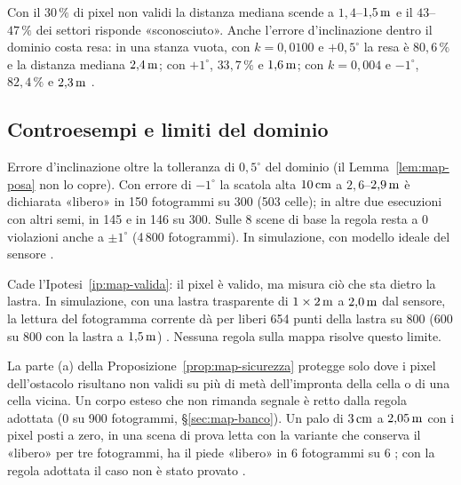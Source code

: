 Con il $30\,\%$ di pixel non validi la distanza mediana scende a $1{,}4$–$1{,}5\,\mathrm{m}$ e il $43$–$47\,\%$ dei settori risponde «sconosciuto». Anche l'errore d'inclinazione dentro il dominio costa resa: in una stanza vuota, con $k=0{,}0100$ e $+0{,}5^\circ$ la resa è $80{,}6\,\%$ e la distanza mediana $2{,}4\,\mathrm{m}$; con $+1^\circ$, $33{,}7\,\%$ e $1{,}6\,\mathrm{m}$; con $k=0{,}004$ e $-1^\circ$, $82{,}4\,\%$ e $2{,}3\,\mathrm{m}$ .

\subsection{Controesempi e limiti del dominio}\label{sec:map-controesempi}

\begin{controesempio}\label{cex:map-inclinazione}
Errore d'inclinazione oltre la tolleranza di $0{,}5^\circ$ del dominio (il Lemma~\ref{lem:map-posa} non lo copre). Con errore di $-1^\circ$ la scatola alta $10\,\mathrm{cm}$ a $2{,}6$–$2{,}9\,\mathrm{m}$ è dichiarata «libero» in 150 fotogrammi su 300 (503 celle); in altre due esecuzioni con altri semi, in 145 e in 146 su 300. Sulle 8 scene di base la regola resta a 0 violazioni anche a $\pm1^\circ$ (4\,800 fotogrammi). In simulazione, con modello ideale del sensore .
\end{controesempio}

\begin{controesempio}\label{cex:map-vetro}
Cade l'Ipotesi~\ref{ip:map-valida}: il pixel è valido, ma misura ciò che sta dietro la lastra. In simulazione, con una lastra trasparente di $1\times2\,\mathrm{m}$ a $2{,}0\,\mathrm{m}$ dal sensore, la lettura del fotogramma corrente dà per liberi 654 punti della lastra su 800 (600 su 800 con la lastra a $1{,}5\,\mathrm{m}$) . Nessuna regola sulla mappa risolve questo limite.
\end{controesempio}

\begin{controesempio}\label{cex:map-muto}
La parte (a) della Proposizione~\ref{prop:map-sicurezza} protegge solo dove i pixel dell'ostacolo risultano non validi su più di metà dell'impronta della cella o di una cella vicina. Un corpo esteso che non rimanda segnale è retto dalla regola adottata (0 su 900 fotogrammi, \S\ref{sec:map-banco}). Un palo di $3\,\mathrm{cm}$ a $2{,}05\,\mathrm{m}$ con i pixel posti a zero, in una scena di prova letta con la variante che conserva il «libero» per tre fotogrammi, ha il piede «libero» in 6 fotogrammi su 6 ; con la regola adottata il caso non è stato provato .
\end{controesempio}

